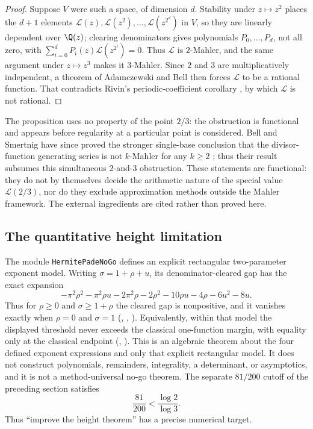 \documentclass[11pt]{article}
\begin{document}
\begin{proof}
Suppose $V$ were such a space, of dimension $d$.  Stability under $z\mapsto z^2$
places the $d+1$ elements $\mathcal L(z),\mathcal L(z^2),\dots,\mathcal
L(z^{2^{d}})$ in $V$, so they are linearly dependent over $\Q(z)$; clearing
denominators gives polynomials $P_0,\dots,P_d$, not all zero, with
$\sum_{i=0}^{d}P_i(z)\mathcal L(z^{2^i})=0$.  Thus $\mathcal L$ is $2$-Mahler,
and the same argument under $z\mapsto z^3$ makes it $3$-Mahler.  Since $2$ and
$3$ are multiplicatively independent, a theorem of Adamczewski and Bell
\cite[Theorem~1]{adamczewskibell2013} then forces $\mathcal L$ to be a rational
function.  That contradicts Rivin's periodic-coefficient corollary
\cite[Cor.~6.4, p.~9]{rivin2026}, by which $\mathcal L$ is not rational.
\end{proof}

The proposition uses no property of the point $2/3$: the obstruction is
functional and appears before regularity at a particular point is considered.
Bell and Smertnig have since proved the stronger single-base conclusion that
the divisor-function generating series is not $k$-Mahler for any $k\ge2$
\cite{bellsmertnig2026}; thus their result subsumes this simultaneous
$2$-and-$3$ obstruction.  These statements are functional: they do not by
themselves decide the arithmetic nature of the special value
$\mathcal L(2/3)$, nor do they exclude approximation methods outside the
Mahler framework.  The external ingredients are cited rather than proved here.

\subsection{The quantitative height limitation}

The module \texttt{HermitePadeNoGo} defines an explicit rectangular
two-parameter exponent model.  Writing $\sigma=1+\rho+u$, its
denominator-cleared gap has the exact expansion
\[
 -\pi^2\rho^2-\pi^2\rho u-2\pi^2\rho-2\rho^2-10\rho u
 -4\rho-6u^2-8u.
\]
Thus for $\rho\ge0$ and $\sigma\ge1+\rho$ the cleared gap is nonpositive, and
it vanishes exactly when $\rho=0$ and $\sigma=1$
(,
,
).
Equivalently, within that model the displayed threshold never exceeds the
classical one-function margin, with equality only at the classical endpoint
(,
).
This is an algebraic theorem about the four defined exponent expressions and
only that explicit rectangular model.  It does not construct polynomials,
remainders, integrality, a determinant, or asymptotics, and it is not a
method-universal no-go theorem.
The separate $81/200$ cutoff of the preceding section satisfies
\[
 \frac{81}{200}<\frac{\log2}{\log3}.
\]
Thus “improve the height theorem” has a precise numerical target.
\end{document}
